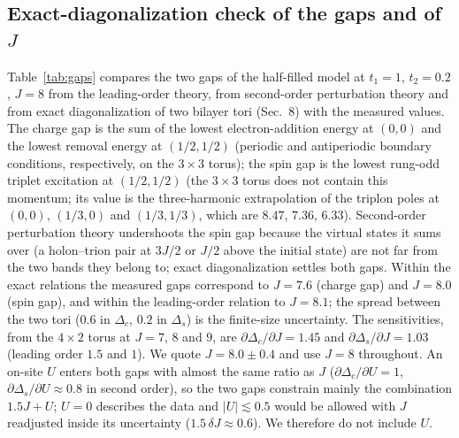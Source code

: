 \documentclass[11pt]{article}
\begin{document}
\subsection{Exact-diagonalization check of the gaps and of $J$}\label{sec:J}
Table~\ref{tab:gaps} compares the two gaps of the half-filled model at $t_1=1$, $t_2=0.2$, $J=8$ from the leading-order theory, from second-order perturbation theory and from exact diagonalization of two bilayer tori (Sec.~8) with the measured values. The charge gap is the sum of the lowest electron-addition energy at $(0,0)$ and the lowest removal energy at $(1/2,1/2)$ (periodic and antiperiodic boundary conditions, respectively, on the $3\times3$ torus); the spin gap is the lowest rung-odd triplet excitation at $(1/2,1/2)$ (the $3\times3$ torus does not contain this momentum; its value is the three-harmonic extrapolation of the triplon poles at $(0,0)$, $(1/3,0)$ and $(1/3,1/3)$, which are $8.47$, $7.36$, $6.33$). Second-order perturbation theory undershoots the spin gap because the virtual states it sums over (a holon--trion pair at $3J/2$ or $J/2$ above the initial state) are not far from the two bands they belong to; exact diagonalization settles both gaps. Within the exact relations the measured gaps correspond to $J=7.6$ (charge gap) and $J=8.0$ (spin gap), and within the leading-order relation to $J=8.1$; the spread between the two tori ($0.6$ in $\Delta_c$, $0.2$ in $\Delta_s$) is the finite-size uncertainty. The sensitivities, from the $4\times2$ torus at $J=7$, $8$ and $9$, are $\partial\Delta_c/\partial J=1.45$ and $\partial\Delta_s/\partial J=1.03$ (leading order $1.5$ and $1$). We quote $J=8.0\pm0.4$ and use $J=8$ throughout. An on-site $U$ enters both gaps with almost the same ratio as $J$ ($\partial\Delta_c/\partial U=1$, $\partial\Delta_s/\partial U\approx0.8$ in second order), so the two gaps constrain mainly the combination $1.5J+U$; $U=0$ describes the data and $|U|\lesssim0.5$ would be allowed with $J$ readjusted inside its uncertainty ($1.5\,\delta J\approx0.6$). We therefore do not include $U$.
\end{document}
